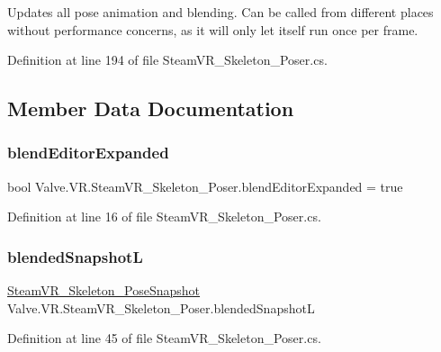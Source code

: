 Updates all pose animation and blending. Can be called from different places without performance concerns, as it will only let itself run once per frame. 



Definition at line 194 of file Steam\+V\+R\+\_\+\+Skeleton\+\_\+\+Poser.\+cs.



\subsection{Member Data Documentation}
\mbox{\label{class_valve_1_1_v_r_1_1_steam_v_r___skeleton___poser_a1bac4a8ce5dd0cedbc5126154932280f}} 
\subsubsection{\texorpdfstring{blendEditorExpanded}{blendEditorExpanded}}
{\footnotesize\ttfamily bool Valve.\+V\+R.\+Steam\+V\+R\+\_\+\+Skeleton\+\_\+\+Poser.\+blend\+Editor\+Expanded = true}



Definition at line 16 of file Steam\+V\+R\+\_\+\+Skeleton\+\_\+\+Poser.\+cs.

\mbox{\label{class_valve_1_1_v_r_1_1_steam_v_r___skeleton___poser_a6ac255b035d6ac7d96141e4767b4d038}} 
\subsubsection{\texorpdfstring{blendedSnapshotL}{blendedSnapshotL}}
{\footnotesize\ttfamily \mbox{\hyperlink{class_valve_1_1_v_r_1_1_steam_v_r___skeleton___pose_snapshot}{Steam\+V\+R\+\_\+\+Skeleton\+\_\+\+Pose\+Snapshot}} Valve.\+V\+R.\+Steam\+V\+R\+\_\+\+Skeleton\+\_\+\+Poser.\+blended\+SnapshotL}



Definition at line 45 of file Steam\+V\+R\+\_\+\+Skeleton\+\_\+\+Poser.\+cs.

